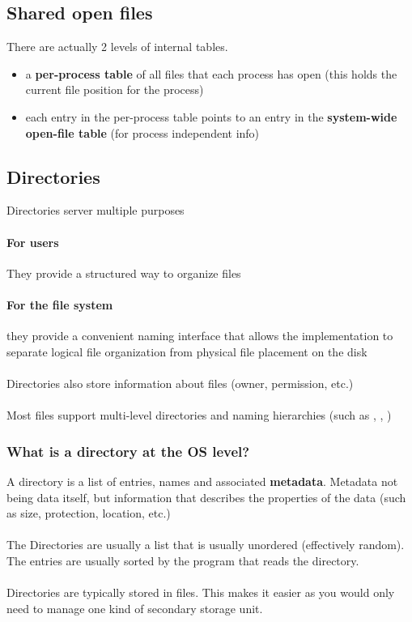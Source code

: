 \documentclass{article}
\begin{document}
\subsection{Shared open files}

There are actually 2 levels of internal tables.
\begin{itemize}
    \item a \textbf{per-process table} of all files that each process has open (this holds the current file position for the process)
    \item each entry in the per-process table points to an entry in the \textbf{system-wide open-file table} (for process independent info)
\end{itemize}

\subsection{Directories}

Directories server multiple purposes

\paragraph{For users} They provide a structured way to organize files
\paragraph{For the file system} they provide a convenient naming interface that allows the implementation to separate logical file organization from physical file placement on the disk
\\
\\
Directories also store information about files (owner, permission, etc.)\\
\\
Most files support multi-level directories and naming hierarchies (such as \codeword{/}, , )

\subsubsection{What is a directory at the OS level?}

A directory is a list of entries, names and associated \textbf{metadata}. Metadata not being data itself, but information that describes the properties of the data (such as size, protection, location, etc.)\\
\\
The Directories are usually a list that is usually unordered (effectively random). The entries are usually sorted by the program that reads the directory.
\\
\\
Directories are typically stored in files. This makes it easier as you would only need to manage one kind of secondary storage unit.
\end{document}
